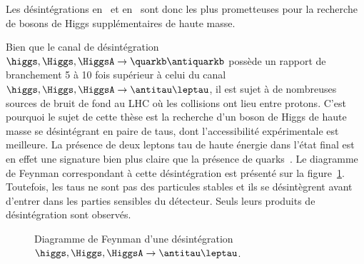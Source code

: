 Les désintégrations en \quarkb\antiquarkb\ et en \antitau\leptau\ sont donc les plus prometteuses pour la recherche de bosons de Higgs supplémentaires de haute masse.
\par Bien que le canal de désintégration $\higgs,\Higgs,\HiggsA \to \quarkb\antiquarkb$ possède un rapport de branchement 5 à 10 fois supérieur à celui du canal $\higgs,\Higgs,\HiggsA \to \antitau\leptau$, il est sujet à de nombreuses sources de bruit de fond au LHC où les collisions ont lieu entre protons.
C'est pourquoi le sujet de cette thèse est la recherche d'un boson de Higgs de haute masse se désintégrant en paire de taus, dont l'accessibilité expérimentale est meilleure.
La présence de deux leptons tau de haute énergie dans l'état final est en effet une signature bien plus claire que la présence de quarks~\quarkb.
Le diagramme de Feynman correspondant à cette désintégration est présenté sur la figure~\ref{fig-H_to_tau_tau_fmf_graph_1}.
Toutefois, les taus ne sont pas des particules stables et ils se désintègrent avant d'entrer dans les parties sensibles du détecteur.
Seuls leurs produits de désintégration sont observés.
\begin{figure}[h]
\centering

\vspace{\baselineskip}
\caption[Désintégration $\higgs, \Higgs, \HiggsA \to \antitau\leptau$.]{Diagramme de Feynman d'une désintégration $\higgs, \Higgs, \HiggsA \to \antitau\leptau$.}
\label{fig-H_to_tau_tau_fmf_graph_1}
\end{figure}
